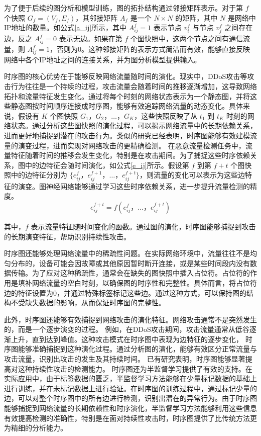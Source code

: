 \documentclass[promaster]{thesis-uestc}
\begin{document}
为了便于后续的图分析和模型训练，图的拓扑结构通过邻接矩阵表示。对于第 \( f \) 个快照 \( G_f = (V_f , E_f) \)，其邻接矩阵 \( A_f \) 是一个 \( N \times N \) 的矩阵，其中 \( N \) 是网络中IP地址的数量。如公式\ref{a_ij}所示，其中 \(A_{ij}^f = 1\) 表示节点 \(v_i^f\) 与节点 \(v_j^f\) 之间存在边，反之 \(A_{ij}^f = 0\) 表示无边。如果在第 \( f \) 个图快照中，这两个节点之间有通信流量，则 \( A_{ij}^f = 1 \)，否则为0。这种邻接矩阵的表示方式简洁而有效，能够直接反映网络中各个IP地址之间的连接关系，并为图分析模型提供输入。

时序图的核心优势在于能够反映网络流量随时间的演化。现实中，DDoS攻击等攻击行为往往是一个持续的过程，攻击流量会随着时间的推移逐渐增加，这导致网络拓扑和流量特征发生变化。通过将每个时刻的网络状态表示为一个静态图，并将这些静态图按时间顺序连接成时序图，能够有效追踪网络流量的动态变化。具体来说，假设有 \( K \) 个图快照 \( G_1， G_2， \dots， G_K \)，这些快照反映了从 \( t_1 \) 到 \( t_K \) 时刻的网络状态。通过分析这些图快照的演化过程，可以揭示网络流量中的长期依赖关系，进而更好地捕捉到潜在的攻击行为。类似的研究已经表明，时序图能够有效建模流量的演变过程，进而实现对网络攻击的更精确检测。
在恶意流量检测任务中，流量特征随着时间的推移会发生变化，特别是在攻击期间。为了捕捉这些时序依赖关系，图中的边特征会随时间演化，如公式\ref{e_ij}所示。假设第 \(f\) 到第 \(f+t\) 个图快照中的边特征分别为 \(\{ e_{ij}^f， e_{ij}^{f+1}， \dots， e_{ij}^{f+t} \}\)，则流量的变化可以表示为这些边特征的演变。图神经网络能够通过学习这些时序依赖关系，进一步提升流量检测的精度。
\begin{equation}
e_{ij}^{f+t} = f(e_{ij}^f， \dots， e_{ij}^{f+t})
\label{e_ij}
\end{equation}

其中，\(f\) 表示流量特征随时间变化的函数。通过图的演化，时序图能够捕捉到攻击的长期演变特征，帮助识别持续性攻击。

时序图还能够处理网络流量中的稀疏性问题。在实际网络环境中，流量往往不是均匀分布的，设备可能会因故障或其他原因暂时断开连接，或是某些时间段内没有数据传输。为了应对这种稀疏性，通常会在缺失的图快照中插入占位符。占位符的作用是填补网络流量的空白时刻，以确保图的时序性和完整性。具体而言，将占位符边的特征设置为0，并通过特殊标签标记这些边。通过这种方式，可以保持图的结构不受缺失数据的影响，从而保证时序图的完整性。

此外，时序图还能够有效捕捉到网络攻击的演化特征。网络攻击通常不是突然发生的，而是一个逐步演变的过程。
例如，在DDoS攻击期间，攻击流量通常从低谷逐渐上升，直到达到峰值。这种攻击模式在时序图中表现为边特征的逐步变化，
时序图能够准确捕捉到这种演化过程。通过分析图的演化，能够有效区分正常流量与攻击流量，识别出攻击的发生及其持续时间。
已有研究表明，时序图能够显著提高对这种持续性攻击的检测能力。
时序图还为半监督学习提供了有效的支持。在实际应用中，由于标签数据的匮乏，半监督学习方法能够在少量标记数据的基础上进行训练，并在未标记数据上进行验证。在时序图的训练过程中，通过标记少量的边，可以对整个时序图中的所有边进行检测，识别出潜在的异常行为。由于时序图能够捕捉到网络流量的长期依赖性和时序演化，半监督学习方法能够利用这些信息有效提高检测的准确性，特别是在面对持续性攻击时，时序图提供了比传统方法更为精细的分析能力。
\end{document}
